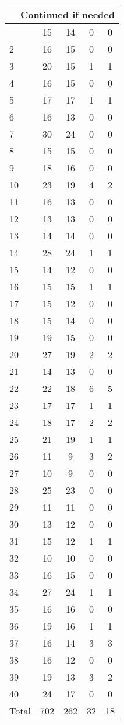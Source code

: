 \begin{center}
\begin{longtable}{l|c|c|c|c}
\hline \multicolumn{5}{|r|}{{Continued if needed}} \\ \hline
\endfoot 
1 & 15 & 14 & 0 & 0\\ \hline
2 & 16 & 15 & 0 & 0\\ \hline
3 & 20 & 15 & 1 & 1\\ \hline
4 & 16 & 15 & 0 & 0\\ \hline
5 & 17 & 17 & 1 & 1\\ \hline
6 & 16 & 13 & 0 & 0\\ \hline
7 & 30 & 24 & 0 & 0\\ \hline
8 & 15 & 15 & 0 & 0\\ \hline
9 & 18 & 16 & 0 & 0\\ \hline
10 & 23 & 19 & 4 & 2\\ \hline
11 & 16 & 13 & 0 & 0\\ \hline
12 & 13 & 13 & 0 & 0\\ \hline
13 & 14 & 14 & 0 & 0\\ \hline
14 & 28 & 24 & 1 & 1\\ \hline
15 & 14 & 12 & 0 & 0\\ \hline
16 & 15 & 15 & 1 & 1\\ \hline
17 & 15 & 12 & 0 & 0\\ \hline
18 & 15 & 14 & 0 & 0\\ \hline
19 & 19 & 15 & 0 & 0\\ \hline
20 & 27 & 19 & 2 & 2\\ \hline
21 & 14 & 13 & 0 & 0\\ \hline
22 & 22 & 18 & 6 & 5\\ \hline
23 & 17 & 17 & 1 & 1\\ \hline
24 & 18 & 17 & 2 & 2\\ \hline
25 & 21 & 19 & 1 & 1\\ \hline
26 & 11 & 9 & 3 & 2\\ \hline
27 & 10 & 9 & 0 & 0\\ \hline
28 & 25 & 23 & 0 & 0\\ \hline
29 & 11 & 11 & 0 & 0\\ \hline
30 & 13 & 12 & 0 & 0\\ \hline
31 & 15 & 12 & 1 & 1\\ \hline
32 & 10 & 10 & 0 & 0\\ \hline
33 & 16 & 15 & 0 & 0\\ \hline
34 & 27 & 24 & 1 & 1\\ \hline
35 & 16 & 16 & 0 & 0\\ \hline
36 & 19 & 16 & 1 & 1\\ \hline
37 & 16 & 14 & 3 & 3\\ \hline
38 & 16 & 12 & 0 & 0\\ \hline
39 & 19 & 13 & 3 & 2\\ \hline
40 & 24 & 17 & 0 & 0\\ \hline
\hline \hline
Total & 702 & 262 & 32 & 18



\end{longtable}
\end{center}

